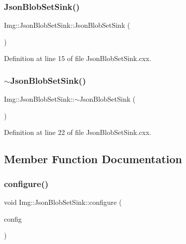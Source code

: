 \subsubsection{\texorpdfstring{Json\+Blob\+Set\+Sink()}{JsonBlobSetSink()}}
{\footnotesize\ttfamily Img\+::\+Json\+Blob\+Set\+Sink\+::\+Json\+Blob\+Set\+Sink (\begin{DoxyParamCaption}{ }\end{DoxyParamCaption})}



Definition at line 15 of file Json\+Blob\+Set\+Sink.\+cxx.

\mbox{\label{class_wire_cell_1_1_img_1_1_json_blob_set_sink_a9d642f0b9d4b0985ed862912d7b92a27}} 
\subsubsection{\texorpdfstring{$\sim$\+Json\+Blob\+Set\+Sink()}{~JsonBlobSetSink()}}
{\footnotesize\ttfamily Img\+::\+Json\+Blob\+Set\+Sink\+::$\sim$\+Json\+Blob\+Set\+Sink (\begin{DoxyParamCaption}{ }\end{DoxyParamCaption})\hspace{0.3cm}{\ttfamily [virtual]}}



Definition at line 22 of file Json\+Blob\+Set\+Sink.\+cxx.



\subsection{Member Function Documentation}
\mbox{\label{class_wire_cell_1_1_img_1_1_json_blob_set_sink_a333681b98322c16bb80800678386babe}} 
\subsubsection{\texorpdfstring{configure()}{configure()}}
{\footnotesize\ttfamily void Img\+::\+Json\+Blob\+Set\+Sink\+::configure (\begin{DoxyParamCaption}\item[{const \hyperlink{namespace_wire_cell_a9f705541fc1d46c608b3d32c182333ee}{Wire\+Cell\+::\+Configuration} \&}]{config }\end{DoxyParamCaption})\hspace{0.3cm}{\ttfamily [virtual]}}



